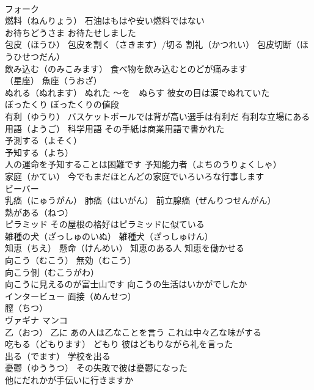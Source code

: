 \documentclass[8pt]{extreport}
\begin{document}
\begin{CJK}{UTF8}{min}
\\	フォーク
\\	燃料（ねんりょう） 石油はもはや安い燃料ではない
\\	お待ちどうさま お待たせしました
\\	包皮（ほうひ） 包皮を割く（さきます）/切る 割礼（かつれい） 包皮切断（ほうひせつだん）
\\	飲み込む（のみこみます） 食べ物を飲み込むとのどが痛みます
\\	（星座）	魚座（うおざ）
\\	ぬれる（ぬれます） ぬれた ～を　ぬらす 彼女の目は涙でぬれていた
\\	ぼったくり ぼったくりの値段
\\	有利（ゆうり） バスケットボールでは背が高い選手は有利だ 有利な立場にある
\\	用語（ようご） 科学用語 その手紙は商業用語で書かれた
\\	予測する（よそく）
\\	予知する（よち）
\\	人の運命を予知することは困難です 予知能力者（よちのうりょくしゃ）
\\	家庭（かてい） 今でもまだほとんどの家庭でいろいろな行事します
\\	ビーバー
\\	乳癌（にゅうがん） 肺癌（はいがん） 前立腺癌（ぜんりつせんがん）
\\	熱がある（ねつ）
\\	ピラミッド その屋根の格好はピラミッドに似ている
\\	雑種の犬（ざっしゅのいぬ） 雑種犬（ざっしゅけん）
\\	知恵（ちえ） 懸命（けんめい） 知恵のある人 知恵を働かせる
\\	向こう（むこう） 無効（むこう）
\\	向こう側（むこうがわ） 
\\	向こうに見えるのが富士山です 向こうの生活はいかがでしたか
\\	インタービュー 面接（めんせつ）
\\	膣（ちつ）
\\	ヴァギナ マンコ
\\	乙（おつ） 乙に あの人は乙なことを言う これは中々乙な味がする
\\	吃もる（どもります） どもり 彼はどもりながら礼を言った
\\	出る（でます） 学校を出る
\\	憂鬱（ゆううつ） その失敗で彼は憂鬱になった
\\	他にだれかが手伝いに行きますか

\end{CJK}
\end{document}
